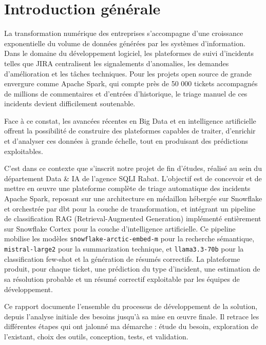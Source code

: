 
\chapter*{Introduction générale}
\label{chap:intro}
\setlength{\parindent}{15pt}
\lfoot{}
La transformation numérique des entreprises s'accompagne d'une croissance exponentielle du volume de données générées par les systèmes d'information. Dans le domaine du développement logiciel, les plateformes de suivi d'incidents telles que JIRA centralisent les signalements d'anomalies, les demandes d'amélioration et les tâches techniques. Pour les projets open source de grande envergure comme Apache Spark, qui compte près de 50 000 tickets accompagnés de millions de commentaires et d'entrées d'historique, le triage manuel de ces incidents devient difficilement soutenable.

Face à ce constat, les avancées récentes en Big Data et en intelligence artificielle offrent la possibilité de construire des plateformes capables de traiter, d'enrichir et d'analyser ces données à grande échelle, tout en produisant des prédictions exploitables.

C'est dans ce contexte que s'inscrit notre projet de fin d'études, réalisé au sein du département Data \& IA de l'agence SQLI Rabat. L'objectif est de concevoir et de mettre en œuvre une plateforme complète de triage automatique des incidents Apache Spark, reposant sur une architecture en médaillon hébergée sur Snowflake et orchestrée par dbt pour la couche de transformation, et intégrant un pipeline de classification RAG (Retrieval-Augmented Generation) implémenté entièrement sur Snowflake Cortex pour la couche d'intelligence artificielle. Ce pipeline mobilise les modèles \texttt{snowflake-arctic-embed-m} pour la recherche sémantique, \texttt{mistral-large2} pour la summarization technique, et \texttt{llama3.3-70b} pour la classification few-shot et la génération de résumés correctifs. La plateforme produit, pour chaque ticket, une prédiction du type d'incident, une estimation de sa résolution probable et un résumé correctif exploitable par les équipes de développement.

Ce rapport documente l’ensemble du processus de développement de la solution, depuis l’analyse initiale des besoins jusqu’à sa mise en œuvre finale. Il retrace les différentes étapes qui ont jalonné ma démarche : étude du besoin, exploration de l’existant, choix des outils, conception, tests, et validation.

